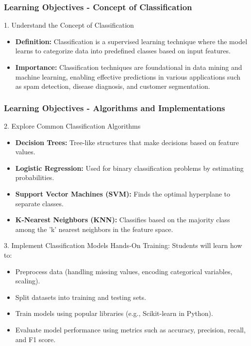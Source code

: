 \documentclass[aspectratio=169]{beamer}
\begin{document}
\begin{frame}[fragile]
    \frametitle{Learning Objectives - Concept of Classification}
    \begin{block}{1. Understand the Concept of Classification}
        \begin{itemize}
            \item \textbf{Definition:} 
            Classification is a supervised learning technique where the model learns to categorize data into predefined classes based on input features.
            \item \textbf{Importance:} 
            Classification techniques are foundational in data mining and machine learning, enabling effective predictions in various applications such as spam detection, disease diagnosis, and customer segmentation.
        \end{itemize}
    \end{block}
\end{frame}

\begin{frame}[fragile]
    \frametitle{Learning Objectives - Algorithms and Implementations}
    \begin{block}{2. Explore Common Classification Algorithms}
        \begin{itemize}
            \item \textbf{Decision Trees:} Tree-like structures that make decisions based on feature values.
            \item \textbf{Logistic Regression:} Used for binary classification problems by estimating probabilities.
            \item \textbf{Support Vector Machines (SVM):} Finds the optimal hyperplane to separate classes.
            \item \textbf{K-Nearest Neighbors (KNN):} Classifies based on the majority class among the 'k' nearest neighbors in the feature space.
        \end{itemize}
    \end{block}

    \begin{block}{3. Implement Classification Models}
        Hands-On Training: Students will learn how to:
        \begin{itemize}
            \item Preprocess data (handling missing values, encoding categorical variables, scaling).
            \item Split datasets into training and testing sets.
            \item Train models using popular libraries (e.g., Scikit-learn in Python).
            \item Evaluate model performance using metrics such as accuracy, precision, recall, and F1 score.
        \end{itemize}
    \end{block}
\end{frame}
\end{document}
